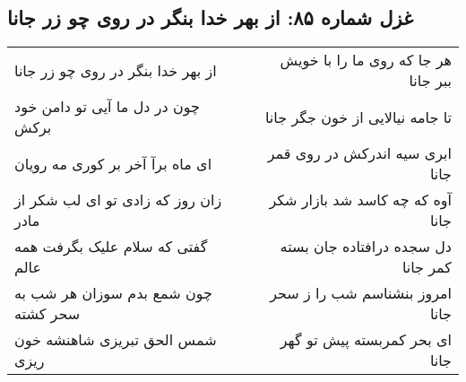 \begin{center}
\section*{غزل شماره ۸۵: از بهر خدا بنگر در روی چو زر جانا}
\label{sec:0085}
\begin{longtable}{l p{0.5cm} r}
از بهر خدا بنگر در روی چو زر جانا
&&
هر جا که روی ما را با خویش ببر جانا
\\
چون در دل ما آیی تو دامن خود برکش
&&
تا جامه نیالایی از خون جگر جانا
\\
ای ماه برآ آخر بر کوری مه رویان
&&
ابری سیه اندرکش در روی قمر جانا
\\
زان روز که زادی تو ای لب شکر از مادر
&&
آوه که چه کاسد شد بازار شکر جانا
\\
گفتی که سلام علیک بگرفت همه عالم
&&
دل سجده درافتاده جان بسته کمر جانا
\\
چون شمع بدم سوزان هر شب به سحر کشته
&&
امروز بنشناسم شب را ز سحر جانا
\\
شمس الحق تبریزی شاهنشه خون ریزی
&&
ای بحر کمربسته پیش تو گهر جانا
\\
\end{longtable}
\end{center}

